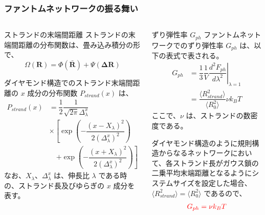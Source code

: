 \documentclass[11pt, dvipdfmx]{beamer}
\begin{document}
\begin{frame}
\frametitle{ファントムネットワークの振る舞い}

\begin{columns}[totalwidth=1\textwidth]
\scriptsize
\begin{block}{ストランドの末端間距離}
ストランドの末端間距離の分布関数は、畳み込み積分の形で、
\vspace{-3mm}
\begin{equation*}
\Omega(\bm{R}) = \Phi(\bar{\bm{R}}) + \Psi(\bm{\Delta R})
\end{equation*}

ダイヤモンド構造でのストランド末端間距離の $x$ 成分の分布関数 $P_{strand}(x)$ は、\vspace{-3mm}
\begin{align*}
P_{strand}(x) 
&= \dfrac{1}{2}\dfrac{1}{\sqrt{2\pi}\Delta_{\lambda}^x} \\
&\times \left[ \exp\left(-\dfrac{(x-X_{\lambda})^2}{2(\Delta_{\lambda}^x)^2} \right) \right. \\
&\quad \left. + \exp\left(-\dfrac{(x+X_{\lambda})^2}{2(\Delta_{\lambda}^x)^2} \right) \right]
\end{align*}
なお、$X_{\lambda}$、$\Delta_{\lambda}^x$ は、伸長比 $\lambda$ である時の、ストランド長及びゆらぎの $x$ 成分を表す。
\end{block}

\scriptsize
\begin{block}{ずり弾性率 $G_{ph}$}
ファントムネットワークでのずり弾性率 $G_{ph}$ は、以下の表式で表される。
\vspace{-3mm}
\begin{align*}
G_{ph} &= \dfrac{1}{3} \dfrac{1}{V} \left. \dfrac{d^2 F_{ph}}{d \lambda^2} \right|_{\lambda = 1}\\
&=\dfrac{\langle R_{strand}^2 \rangle}{\langle R_0^2 \rangle} \nu k_B T
\end{align*}
ここで、$\nu$ は、ストランドの数密度である。

\vspace{3mm}
ダイヤモンド構造のように規則構造からなるネットワークにおいて、各ストランド長がガウス鎖の二乗平均末端距離となるようにシステムサイズを設定した場合、$\langle R_{strand}^2 \rangle = \langle R_0^2 \rangle$ であるので、
\vspace{-3mm}
\begin{align*}
\color{red}
G_{ph}= \nu k_B T
\end{align*}

\end{block}
\end{columns}
\end{frame}
\end{document}
